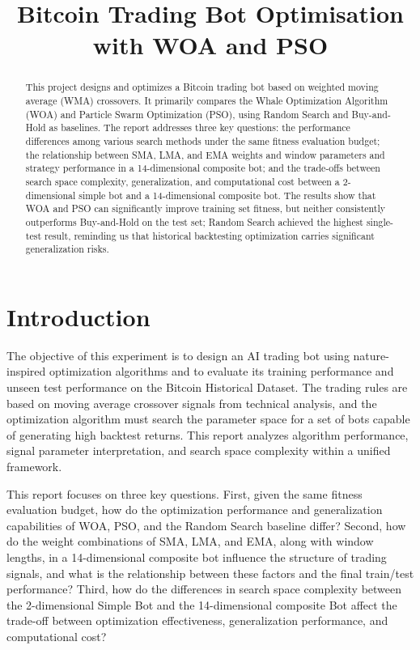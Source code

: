 \documentclass[11pt,a4paper]{article}
\title{\textbf{Bitcoin Trading Bot Optimisation with WOA and PSO}}
\author{}
\date{}
\begin{document}
\maketitle

\begin{abstract}
This project designs and optimizes a Bitcoin trading bot based on weighted moving average (WMA) crossovers. It primarily compares the Whale Optimization Algorithm (WOA) and Particle Swarm Optimization (PSO), using Random Search and Buy-and-Hold as baselines. The report addresses three key questions: the performance differences among various search methods under the same fitness evaluation budget; the relationship between SMA, LMA, and EMA weights and window parameters and strategy performance in a 14-dimensional composite bot; and the trade-offs between search space complexity, generalization, and computational cost between a 2-dimensional simple bot and a 14-dimensional composite bot. The results show that WOA and PSO can significantly improve training set fitness, but neither consistently outperforms Buy-and-Hold on the test set; Random Search achieved the highest single-test result, reminding us that historical backtesting optimization carries significant generalization risks.
\end{abstract}

\section{Introduction}
The objective of this experiment is to design an AI trading bot using nature-inspired optimization algorithms and to evaluate its training performance and unseen test performance on the Bitcoin Historical Dataset. The trading rules are based on moving average crossover signals from technical analysis, and the optimization algorithm must search the parameter space for a set of bots capable of generating high backtest returns. This report analyzes algorithm performance, signal parameter interpretation, and search space complexity within a unified framework.

This report focuses on three key questions. First, given the same fitness evaluation budget, how do the optimization performance and generalization capabilities of WOA, PSO, and the Random Search baseline differ? Second, how do the weight combinations of SMA, LMA, and EMA, along with window lengths, in a 14-dimensional composite bot influence the structure of trading signals, and what is the relationship between these factors and the final train/test performance? Third, how do the differences in search space complexity between the 2-dimensional Simple Bot and the 14-dimensional composite Bot affect the trade-off between optimization effectiveness, generalization performance, and computational cost?
\end{document}
